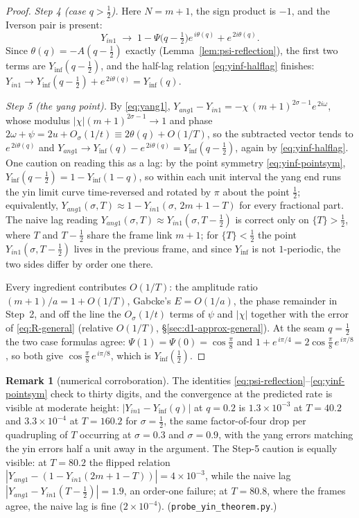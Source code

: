 \documentclass[11pt]{article}
\theoremstyle{definition}
\newtheorem{remark}[theorem]{Remark}
\begin{document}
\begin{proof}
\emph{Step 4 (case $q>\tfrac12$).} Here $N=m+1$, the sign product is
$-1$, and the Iverson pair is present:
\[
Y_{in1}\;\longrightarrow\;
1-\Psi\bigl(q-\tfrac12\bigr)e^{\,i\theta(q)}+e^{\,2i\theta(q)} .
\]
Since $\theta(q)=-A(q-\tfrac12)$ exactly (Lemma~\ref{lem:psi-reflection}),
the first two terms are $Y_{\inf}(q-\tfrac12)$, and the half-lag relation
\eqref{eq:yinf-halflag} finishes:
$Y_{in1}\to Y_{\inf}(q-\tfrac12)+e^{\,2i\theta(q)}=Y_{\inf}(q)$.

\emph{Step 5 (the yang point).} By \eqref{eq:yang1},
$Y_{ang1}-Y_{in1}=-\chi\,(m+1)^{2\sigma-1}e^{\,2i\omega}$, whose modulus
$|\chi|(m+1)^{2\sigma-1}\to1$ and phase $2\omega+\psi=2u+O_\sigma(1/t)
\equiv2\theta(q)+O(1/T)$, so the subtracted vector tends to
$e^{\,2i\theta(q)}$ and
$Y_{ang1}\to Y_{\inf}(q)-e^{\,2i\theta(q)}=Y_{\inf}(q-\tfrac12)$, again by
\eqref{eq:yinf-halflag}. One caution on reading this as a lag: by the point
symmetry \eqref{eq:yinf-pointsym},
$Y_{\inf}(q-\tfrac12)=1-Y_{\inf}(1-q)$, so within each unit interval the
yang end runs the yin limit curve time-reversed and rotated by $\pi$ about
the point $\tfrac12$; equivalently,
$Y_{ang1}(\sigma,T)\approx1-Y_{in1}(\sigma,\,2m{+}1{-}T)$ for every
fractional part. The naive lag reading
$Y_{ang1}(\sigma,T)\approx Y_{in1}(\sigma,T-\tfrac12)$ is correct only on
$\{T\}>\tfrac12$, where $T$ and $T-\tfrac12$ share the frame link $m+1$;
for $\{T\}<\tfrac12$ the point $Y_{in1}(\sigma,T-\tfrac12)$ lives in the
previous frame, and since $Y_{\inf}$ is not $1$-periodic, the two sides
differ by order one there.

Every ingredient contributes $O(1/T)$: the amplitude ratio
$(m+1)/a=1+O(1/T)$, Gabcke's $E=O(1/a)$, the phase remainder in Step~2,
and off the line the $O_\sigma(1/t)$ terms of $\psi$ and $|\chi|$ together
with the error of \eqref{eq:R-general} (relative $O(1/T)$,
\S\ref{sec:d1-approx-general}). At the seam $q=\tfrac12$ the two case
formulas agree: $\Psi(1)=\Psi(0)=\cos\tfrac\pi8$ and
$1+e^{\,i\pi/4}=2\cos\tfrac\pi8\,e^{\,i\pi/8}$, so both give
$\cos\tfrac\pi8\,e^{\,i\pi/8}$, which is $Y_{\inf}(\tfrac12)$.
\end{proof}

\begin{remark}[numerical corroboration]
The identities \eqref{eq:psi-reflection}--\eqref{eq:yinf-pointsym} check to
thirty digits, and the convergence at the predicted rate is visible at
moderate height: $|Y_{in1}-Y_{\inf}(q)|$ at $q=0.2$ is $1.3\times10^{-3}$
at $T=40.2$ and $3.3\times10^{-4}$ at $T=160.2$ for $\sigma=\tfrac12$, the
same factor-of-four drop per quadrupling of $T$ occurring at $\sigma=0.3$
and $\sigma=0.9$, with the yang errors matching the yin errors half a unit
away in the argument. The Step-5 caution is equally visible: at $T=80.2$
the flipped relation $|Y_{ang1}-(1-Y_{in1}(2m{+}1{-}T))|=4\times10^{-3}$,
while the naive lag $|Y_{ang1}-Y_{in1}(T-\tfrac12)|=1.9$, an order-one
failure; at $T=80.8$, where the frames agree, the naive lag is fine
($2\times10^{-4}$). (\texttt{probe\_yin\_theorem.py}.)
\end{remark}
\end{document}
